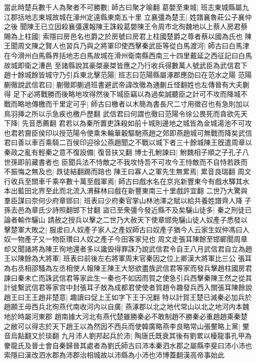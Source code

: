 當此時楚兵數千人為聚者不可勝數|{
	師古曰聚才喻翻}
葛嬰至東城|{
	班志東城縣屬九江郡括地志東城故城在濠州定遠縣東南五十里}
立襄彊為楚王|{
	姓譜襄魯莊公子襄仲之後}
聞陳王已立因殺襄彊還報陳王誅殺葛嬰陳王令周市北徇魏地以上蔡人房君蔡賜為上柱國|{
	索隱曰房邑名也爵之於房號曰房君上柱國楚爵之尊者蔡以國為氏也}
陳王聞周文陳之賢人也習兵乃與之將軍印使西擊秦武臣等從白馬渡河|{
	師古曰白馬津在今滑州白馬縣界括地志白馬故城在滑州衛南縣西南三十四里戴延之西征記曰白馬故城即衛之漕邑}
至諸縣說其豪桀豪桀皆應之乃行收兵得數萬人號武臣為武信君下趙十餘城餘皆城守乃引兵東北擊范陽|{
	班志曰范陽縣屬涿郡應劭曰在范水之陽}
范陽蒯徹說武信君曰|{
	蒯徹即蒯過班書避武帝諱改徹為通蒯丘怪翻姓也左傳晉有大夫蒯得}
足下必將戰勝而後略地攻得然後下城臣竊以為過矣誠聽臣之計可不攻而降城不戰而略地傳檄而千里定可乎|{
	師古曰檄者以木簡為書長尺二寸用徵召也有急則加以鳥羽挿之所以示急疾也檄戶歷翻}
武信君曰何謂也徹曰范陽令徐公畏死而貪欲先天下降|{
	先音悉薦翻}
君若以為秦所置吏誅殺如前十城則邊地之城皆為金城湯池不可攻也君若齎臣侯印以授范陽令使乘朱輪華轂驅馳燕趙之郊即燕趙城可無戰而降矣武信君曰善以車百乘騎二百侯印迎徐公燕趙聞之不戰以城下者三十餘城陳王旣遣周章以秦政之亂有輕秦之意不復設備|{
	復音扶又翻}
博士孔鮒諫曰|{
	鮒魏相子順之子孔子八世孫即前藏書者也}
臣聞兵法不恃敵之不我攻恃吾不可攻今王恃敵而不自恃若跌而不振悔之無及也|{
	跌徒結翻踢而踣也}
陳王曰寡人之軍先生無累焉|{
	累音良瑞翻}
周文行收兵至關車千乘卒數十萬至戲軍焉|{
	師古曰戲水名在京兆新豐東今有戲水驛其水本出藍田北界至此而北流入渭蘇林曰戲在新豐東南三十里戲許宜翻}
二世乃大驚與羣臣謀曰奈何少府章邯曰|{
	班表曰少府秦官掌山林池澤之賦以給共養姓譜齊人降子孫去邑為章氏少詩照翻邯下甘翻}
盜已至衆彊今發近縣不及矣驪山徒多|{
	秦之刑徒已論者輸作驪山}
請赦之授兵以擊之二世乃大赦天下使章邯免驪山徒人奴產子悉發以擊楚軍大敗之|{
	服䖍曰人奴產子家人之產奴師古曰奴產子猶今人云家生奴仲馮曰人奴一物產子又一物臣瓚曰人奴之產子今田客家兒也}
周文走張耳陳餘至邯鄲聞周章却又聞諸將為陳王徇地還者多以讒毁得罪誅乃說武信君令自王八月武信君自立為趙王以陳餘為大將軍|{
	班表曰前後左右將軍周末官秦因之位上卿漢大將軍比三公}
張耳為右丞相邵騷為左丞相使人報陳王陳王大怒欲盡族武信君等家而發兵擊趙柱國房君諫曰秦未亡而誅武信君等家此生一秦也不如因而賀之使急引兵西擊秦陳王然之從其計徙繫武信君等家宫中封張耳子敖為成都君使使者賀趙令趣發兵西入關張耳陳餘說趙王曰王王趙非楚意|{
	趣讀曰促上王如字下王于况翻}
特以計賀王楚已滅秦必加兵於趙願王毋西兵北徇燕代南收河内以自廣|{
	燕涿郡以北之地代常山以北之地河内本魏地於時屬河東郡}
趙南據大河北有燕代楚雖勝秦必不敢制趙不勝秦必重趙趙乘秦楚之敝可以得志於天下趙王以為然因不西兵而使韓廣略燕李良略常山張黶略上黨|{
	黶音烏點翻又於琰翻}
九月沛人劉邦起兵於沛|{
	陶唐氏既衰其後有劉累以櫌龍事孔甲為豢龍氏及晉士會自秦歸晉其處者為劉氏師古曰沛本秦泗水郡之屬縣李斐曰沛小沛也索隱曰漢改泗水郡為沛郡治相城故以沛縣為小沛也沛博蓋翻漢高帝事始此}
